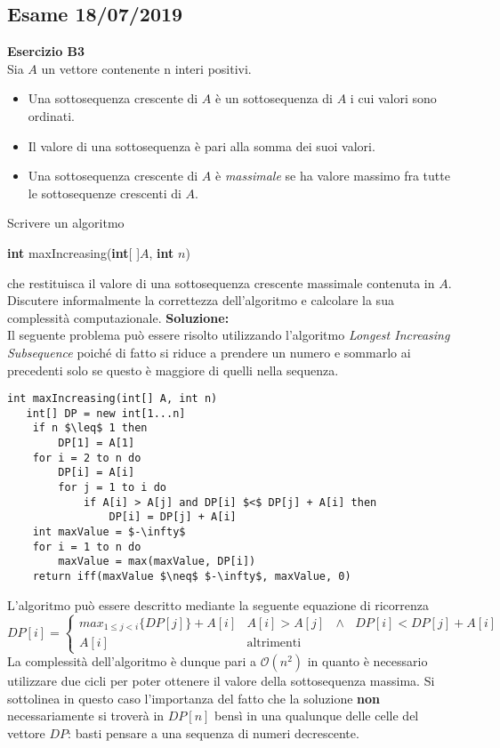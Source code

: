 \documentclass[../cheatSheetAlgoritmi.tex]{subfiles}
\begin{document}
\subsection{Esame 18/07/2019}
\textbf{Esercizio B3}\\
Sia $A$ un vettore contenente n interi positivi.
\begin{itemize}
	\item Una sottosequenza crescente di $A$ è un sottosequenza di $A$ i cui valori sono ordinati.
	\item Il valore di una sottosequenza è pari alla somma dei suoi valori.
	\item Una sottosequenza crescente di $A$ è \emph{massimale} se ha valore massimo fra tutte le sottosequenze crescenti di $A$.
\end{itemize}
Scrivere un algoritmo 
\begin{center}
	\textbf{int} maxIncreasing(\textbf{int}[ ]$A$, \textbf{int} $n$)
\end{center}
che  restituisca  il valore di  una  sottosequenza  crescente massimale contenuta in $A$. Discutere  informalmente  la  correttezza  dell'algoritmo  e calcolare la sua complessità computazionale.
\textbf{Soluzione:}\\
Il seguente problema può essere risolto utilizzando l'algoritmo \emph{Longest Increasing Subsequence} poiché di fatto si riduce a prendere un numero e sommarlo ai precedenti solo se questo è maggiore di quelli nella sequenza.
\begin{lstlisting}[caption=Longest Increasing Subsequence]
int maxIncreasing(int[] A, int n)
   int[] DP = new int[1...n]
   	if n $\leq$ 1 then
   		DP[1] = A[1]
	for i = 2 to n do
		DP[i] = A[i]
		for j = 1 to i do
			if A[i] > A[j] and DP[i] $<$ DP[j] + A[i] then
				DP[i] = DP[j] + A[i]
	int maxValue = $-\infty$
	for i = 1 to n do
		maxValue = max(maxValue, DP[i])
	return iff(maxValue $\neq$ $-\infty$, maxValue, 0)
\end{lstlisting}
L'algoritmo può essere descritto mediante la seguente equazione di ricorrenza
\begin{equation*}
  	DP[i]=\begin{cases}
    	max_{1 \leq j < i}\{DP[j]\} + A[i] & \text{$A[i] > A[j]$ $\land$ $DP[i] < DP[j] + A[i]  $}\\
    	A[i] & \text{altrimenti}
  	\end{cases}
\end{equation*}
La complessità dell'algoritmo è dunque pari a $\mathcal{O}(n^{2})$ in quanto è necessario utilizzare due cicli per poter ottenere il valore della sottosequenza massima. Si sottolinea in questo caso l'importanza del fatto che la soluzione \textbf{non} necessariamente si troverà in $DP[n]$ bensì in una qualunque delle celle del vettore $DP$: basti pensare a una sequenza di numeri decrescente.\\
\end{document}
